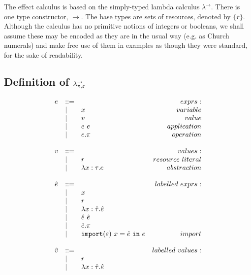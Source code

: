 The effect calculus is based on the simply-typed lambda calculus $\lambda^{\rightarrow}$. There is one type constructor, $\rightarrow$. The base types are sets of resources, denoted by $\{ \bar r \}$. Although the calculus has no primitive notions of integers or booleans, we shall assume these may be encoded as they are in the usual way (e.g. as Church numerals) and make free use of them in examples as though they were standard, for the sake of readability.

\subsection{Definition of $\lambda^{\rightarrow}_{\pi, \varepsilon}$}

\begin{figure}[h]
\vspace{-5pt}

\[
\begin{array}{lll}

\begin{array}{lllr}

e & ::= & ~ & exprs: \\
	& | & x & variable \\
	& | & v & value \\
	& | & e ~ e & application \\
	& | & e.\pi & operation \\
	&&\\

v & ::= & ~ & values: \\
	& | & r & resource~literal \\
	& | & \lambda x: \tau.e & abstraction \\
	&&\\
	
\hat e & ::= & ~ & labelled~exprs: \\
	& | & x \\
	& | & r \\
	& | & \lambda x: \hat \tau.\hat e \\
	& | & \hat e ~ \hat e \\
	& | & \hat e.\pi \\
	& | & \mathtt{import}(\varepsilon)~x = \hat e~\mathtt{in}~e & import \\
	&&\\

\hat v & ::= & ~ & labelled~values: \\
	& | & r \\
	& | & \lambda x: \hat \tau.\hat e \\
	&&\\


\end{array}
\end{array}\]
\end{figure}
